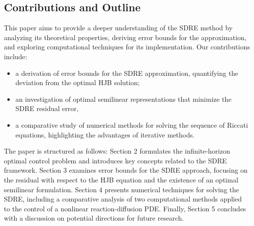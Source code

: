 \documentclass{article}
\begin{document}
\subsection{Contributions and Outline}
This paper aims to provide a deeper understanding of the SDRE method by analyzing its theoretical properties, deriving error bounds for the approximation, and exploring computational techniques for its implementation. Our contributions include:
\begin{itemize}
\item a derivation of error bounds for the SDRE approximation, quantifying the deviation from the optimal HJB solution;
\item an investigation of optimal semilinear representations that minimize the SDRE residual error,
\item a comparative study of numerical methods for solving the sequence of Riccati equations, highlighting the advantages of iterative methods.
\end{itemize}
The paper is structured as follows: Section 2 formulates the infinite-horizon optimal control problem and introduces key concepts related to the SDRE framework. Section 3 examines error bounds for the SDRE approach, focusing on the residual with respect to the HJB equation and the existence of an optimal semilinear formulation. Section 4 presents numerical techniques for solving the SDRE, including a comparative analysis of two computational methods applied to the control of a nonlinear reaction-diffusion PDE. Finally, Section 5 concludes with a discussion on potential directions for future research.
\end{document}
